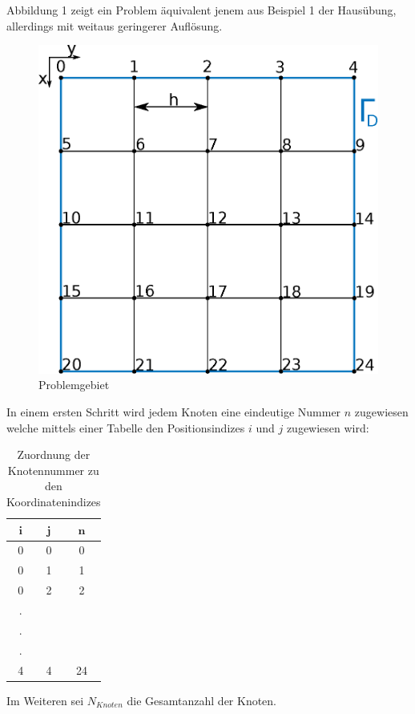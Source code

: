  Abbildung 1 zeigt ein Problem äquivalent jenem aus Beispiel 1 der Hausübung, allerdings mit weitaus geringerer Auflösung.
 \begin{figure}[htbp]
 	\centering
 	\includegraphics[scale=1]{pics/grid_1.eps}
 	\caption{Problemgebiet}
 	\label{fig:grid_1}
 \end{figure}
	
	In einem ersten Schritt wird jedem Knoten eine eindeutige Nummer $n$  zugewiesen welche mittels einer Tabelle den Positionsindizes $i$ und $j$ zugewiesen wird:\newline
	
\begin{table}[htbp]
	\centering
\begin{tabular}{c|c|c}
$\mathbf{i}$	& $\mathbf{j}$ & $\mathbf{n}$ \\
	\hline\hline
	0&0&0\\
	0&1&1\\
	0&2&2\\
	.&&\\
	.&&\\
	.&&\\
	4&4&24
\end{tabular}
\caption{Zuordnung der Knotennummer zu den Koordinatenindizes}
\end{table}
Im Weiteren sei $N_{Knoten}$ die Gesamtanzahl der Knoten.
     
